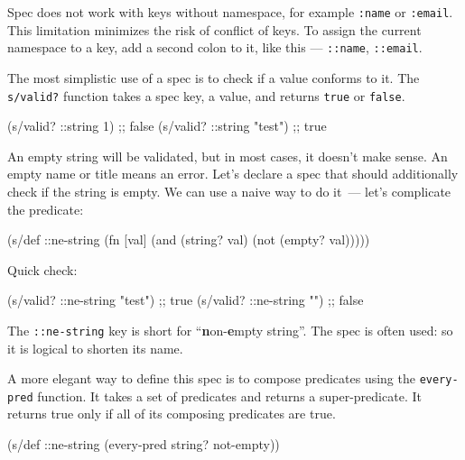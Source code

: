 
Spec does not work with keys without namespace, for example \verb|:name| or \verb|:email|. This limitation minimizes the risk of conflict of keys. To assign the current namespace to a key, add a second colon to it, like this — \verb|::name|, \verb|::email|.


The most simplistic use of a spec is to check if a value conforms to it. The \verb|s/valid?| function takes a spec key, a value, and returns \verb|true| or \verb|false|.

\begin{english}
  \begin{clojure}
(s/valid? ::string 1)      ;; false
(s/valid? ::string "test") ;; true
  \end{clojure}
\end{english}

An empty string will be validated, but in most cases, it doesn't make sense. An empty name or title means an error. Let's declare a spec that should additionally check if the string is empty. We can use a naive way to do it~--- let's complicate the predicate:


\begin{english}
  \begin{clojure}
(s/def ::ne-string
  (fn [val]
    (and (string? val)
         (not (empty? val)))))
  \end{clojure}
\end{english}

\noindent
Quick check:

\begin{english}
  \begin{clojure}
(s/valid? ::ne-string "test") ;; true
(s/valid? ::ne-string "")     ;; false
  \end{clojure}
\end{english}

The \verb|::ne-string| key is short for ``\textbf{n}on-\textbf{e}mpty
string''. The spec is often used: so it is logical to shorten its name.

A more elegant way to define this spec is to compose predicates using the \verb|every-pred| function. It takes a set of predicates and returns a super-predicate. It returns true only if all of its composing predicates are true.

\begin{english}
  \begin{clojure}
(s/def ::ne-string
  (every-pred string? not-empty))
  \end{clojure}
\end{english}


